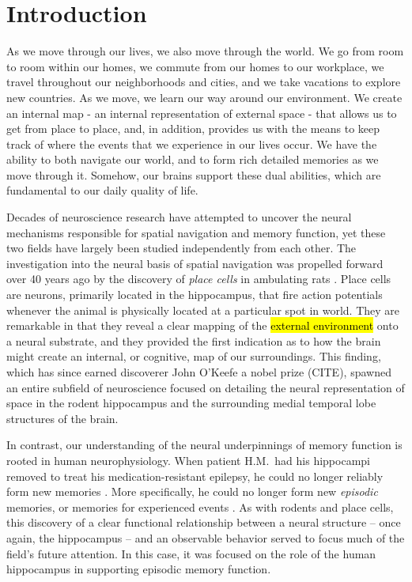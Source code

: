 \chapter{Introduction}
\large


%
%
%

As we move through our lives, we also move through the world. We go from room to room within our homes, we commute from our homes to our workplace, we travel throughout our neighborhoods and cities, and we take vacations to explore new countries. As we move, we learn our way around our environment. We create an internal map - an internal representation of external space - that allows us to get from place to place, and, in addition, provides us with the means to keep track of where the events that we experience in our lives occur. We have the ability to both navigate our world, and to form rich detailed memories as we move through it. Somehow, our brains support these dual abilities, which are fundamental to our daily quality of life.

Decades of neuroscience research have attempted to uncover the neural mechanisms responsible for spatial navigation and memory function, yet these two fields have largely been studied independently from each other. The investigation into the neural basis of spatial navigation was propelled forward over 40 years ago by the discovery of \textit{place cells} in ambulating rats \citep{OKeeDost71}. Place cells are neurons, primarily located in the hippocampus, that fire action potentials whenever the animal is physically located at a particular spot in world. They are remarkable in that they reveal a clear mapping of the \hl{external environment} onto a neural substrate, and they provided the first indication as to how the brain might create an internal, or cognitive, map of our surroundings. This finding, which has since earned discoverer John O'Keefe a nobel prize (CITE), spawned an entire subfield of neuroscience focused on detailing the neural representation of space in the rodent hippocampus and the surrounding medial temporal lobe structures of the brain.

In contrast, our understanding of the neural underpinnings of memory function is rooted in human neurophysiology. When patient H.M.\ had his hippocampi removed to treat his medication-resistant epilepsy, he could no longer reliably form new memories \citep{ScovMiln57}. More specifically, he could no longer form new \textit{episodic} memories, or memories for experienced events \citep{Tulv72}. As with rodents and  place cells, this discovery of a clear functional relationship between a neural structure -- once again, the hippocampus -- and an observable behavior served to focus much of the field's future attention. In this case, it was focused on the role of the human hippocampus in supporting episodic memory function.

